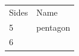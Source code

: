 \begin{table}[H]
{    %
    
        \begin{center}
      
      \label{m38380*uid92}
      
    \noindent
      \tablelasttail{}
     
\begin{xtabular*}{\mytablewidth}[t]{|p{10\mystarwidth}|p{10\mystarwidth}|}\hline
    
    
        Sides &
    
    
        Name%
     \tabularnewline{}
    
    
        5 &
    
    
        pentagon%
     \tabularnewline{}
    
    
        6 &
    
    

\end{xtabular*}
\end{center}}
\end{table}
